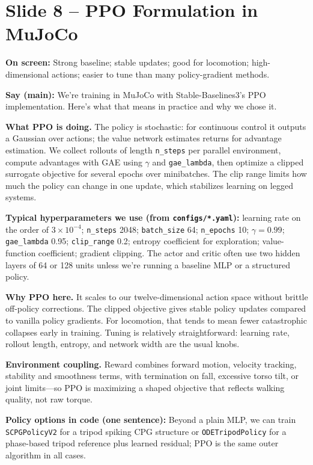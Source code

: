 \documentclass[11pt]{article}
\begin{document}
\section{Slide 8 -- PPO Formulation in MuJoCo}
\textbf{On screen:} Strong baseline; stable updates; good for locomotion; high-dimensional actions; easier to tune than many policy-gradient methods.

\textbf{Say (main):}
We're training in MuJoCo with Stable-Baselines3's PPO implementation. Here's what that means in practice and why we chose it.

\textbf{What PPO is doing.}
The policy is stochastic: for continuous control it outputs a Gaussian over actions; the value network estimates returns for advantage estimation. We collect rollouts of length \texttt{n\_steps} per parallel environment, compute advantages with GAE using $\gamma$ and \texttt{gae\_lambda}, then optimize a clipped surrogate objective for several epochs over minibatches. The clip range limits how much the policy can change in one update, which stabilizes learning on legged systems.

\textbf{Typical hyperparameters we use (from \texttt{configs/*.yaml}):}
learning rate on the order of $3\times10^{-4}$; \texttt{n\_steps} 2048; \texttt{batch\_size} 64; \texttt{n\_epochs} 10; $\gamma=0.99$; \texttt{gae\_lambda} 0.95; \texttt{clip\_range} 0.2; entropy coefficient for exploration; value-function coefficient; gradient clipping. The actor and critic often use two hidden layers of 64 or 128 units unless we're running a baseline MLP or a structured policy.

\textbf{Why PPO here.}
It scales to our twelve-dimensional action space without brittle off-policy corrections. The clipped objective gives stable policy updates compared to vanilla policy gradients. For locomotion, that tends to mean fewer catastrophic collapses early in training. Tuning is relatively straightforward: learning rate, rollout length, entropy, and network width are the usual knobs.

\textbf{Environment coupling.}
Reward combines forward motion, velocity tracking, stability and smoothness terms, with termination on fall, excessive torso tilt, or joint limits---so PPO is maximizing a shaped objective that reflects walking quality, not raw torque.

\textbf{Policy options in code (one sentence):}
Beyond a plain MLP, we can train \texttt{SCPGPolicyV2} for a tripod spiking CPG structure or \texttt{ODETripodPolicy} for a phase-based tripod reference plus learned residual; PPO is the same outer algorithm in all cases.
\end{document}
